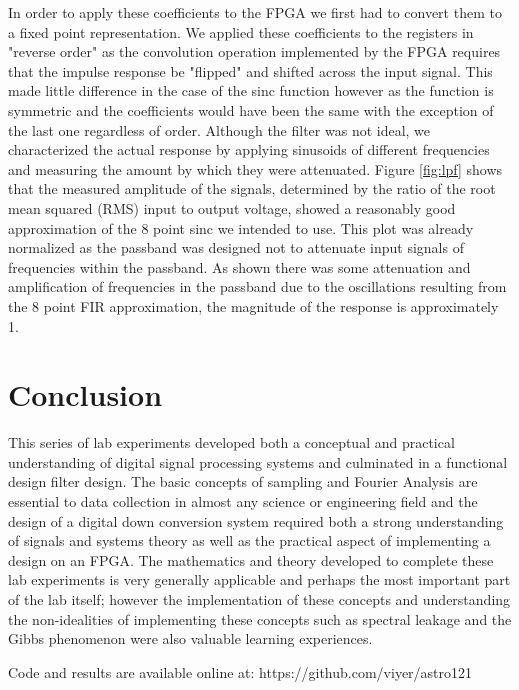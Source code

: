 \documentclass{article}
\begin{document}
  In order to apply these coefficients to the FPGA we first had to convert them to a fixed point representation.
We applied these coefficients to the registers in "reverse order" as the convolution operation implemented by the FPGA requires that the impulse response be "flipped" and shifted across the input signal. This made little difference in the case of the sinc function however as the function is symmetric and the coefficients would have been the same with the exception of the last one regardless of order.
  Although the filter was not ideal, we characterized the actual response by applying sinusoids of different frequencies and measuring the amount by which they were attenuated. Figure \ref{fig:lpf} shows that the measured amplitude of the signals, determined by the ratio of the root mean squared (RMS) input to output voltage, showed a reasonably good approximation of the 8 point sinc we intended to use. This plot was already normalized as the passband was designed not to attenuate input signals of frequencies within the passband.  As shown there was some attenuation and amplification of frequencies in the passband due to the oscillations resulting from the 8 point FIR approximation, the magnitude of the response is approximately 1.
  

\section{Conclusion}
  This series of lab experiments developed both a conceptual and practical understanding of digital signal processing systems and culminated in a functional design filter design. The basic concepts of sampling and Fourier Analysis are essential to data collection in almost any science or engineering field and the design of a digital down conversion system required both a strong understanding of signals and systems theory as well as the practical aspect of implementing a design on an FPGA. The mathematics and theory developed to complete these lab experiments is very generally applicable and perhaps the most important part of the lab itself; however the implementation of these concepts and understanding the non-idealities of implementing these concepts such as spectral leakage and the Gibbs phenomenon were also valuable learning experiences.
  
Code and results are available online at: https://github.com/viyer/astro121




\end{document}
